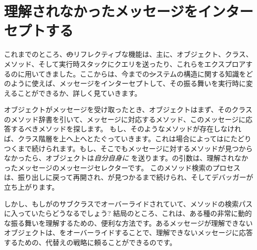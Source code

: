 \documentclass[a4paper,10pt,twoside]{book}
\begin{document}
\section{理解されなかったメッセージをインターセプトする}

これまでのところ、\st のリフレクティブな機能は、主に、オブジェクト、クラス、メソッド、そして実行時スタックにクエリを送ったり、これらをエクスプロアするのに用いてきました。ここからは、今までの\st システムの構造に関する知識をどのように使えば、メッセージをインターセプトして、その振る舞いを実行時に変えることができるか、詳しく見ていきます。

オブジェクトがメッセージを受け取ったとき、オブジェクトはまず、そのクラスのメソッド辞書を引いて、メッセージに対応するメソッド、このメッセージに応答するべきメソッドを探します。
もし、そのようなメソッドが存在しなければ、クラス階層を上へ上へとたぐっていきます。これは場合によってはにたどりつくまで続けられます。もし、そこでもメッセージに対するメソッドが見つからなかったら、オブジェクトは\emph{自分自身に} を送ります。の引数は、理解されなかったメッセージのメッセージセレクターです。
このメソッド検索のプロセスは、振り出しに戻って再開され、が見つかるまで続けられ、そしてデバッガーが立ち上がります。

しかし、もしがのサブクラスでオーバーライドされていて、メソッドの検索パスに入っていたらどうなるでしょう?
結局のところ、これは、ある種の非常に動的な振る舞いを理解するための、便利な方法です。あるメッセージが理解できないオブジェクトは、をオーバーライドすることで、理解できないメッセージに応答するための、代替えの戦略に頼ることができるのです。%
\end{document}
